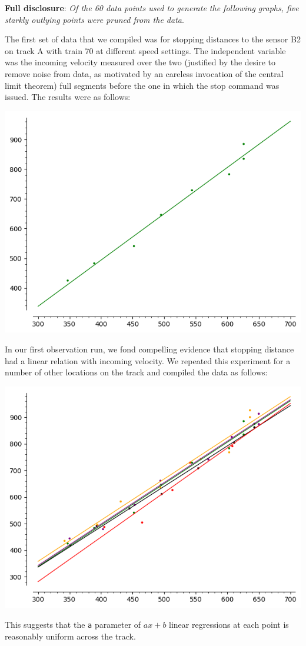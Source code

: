 \documentclass{amsart} \usepackage{amsmath} \usepackage{upgreek}
\begin{document}
\textbf{Full disclosure}: \textit{Of the 60 data points used to generate the following graphs, five starkly outlying points were pruned from the data}.

The first set of data that we compiled was for stopping distances to the sensor B2 on track A with train 70 at different speed settings. The independent variable was the incoming velocity measured over the two (justified by the desire to remove noise from data, as motivated by an careless invocation of the central limit theorem) full segments before the one in which the stop command was issued. The results were as follows:
\begin{center}
\includegraphics[scale=0.5]{x17s}
\end{center}
In our first observation run, we fond compelling evidence that stopping distance had a linear relation with incoming velocity. We repeated this experiment for a number of other locations on the track and compiled the data as follows:
\begin{center}
\includegraphics[scale=0.5]{all}
\end{center}
This suggests that the \texttt{a} parameter of $ax+b$ linear regressions at each point is reasonably uniform across the track.
\end{document}
